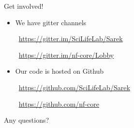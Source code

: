 \documentclass{beamer}
\begin{document}
\begin{frame}{Get involved!}
	\begin{itemize}
		\item We have gitter channels

		\faGitter\ \url{https://gitter.im/SciLifeLab/Sarek}

		\faGitter\ \url{https://gitter.im/nf-core/Lobby}
		\pause
	\end{itemize}
	\begin{itemize}
		\item Our code is hosted on Github

		\faGithub\ \url{https://github.com/SciLifeLab/Sarek}

		\faGithub\ \url{https://github.com/nf-core}
	\end{itemize}
\end{frame}

{
	\begin{frame}{Any questions?}
	\end{frame}
}
\end{document}
